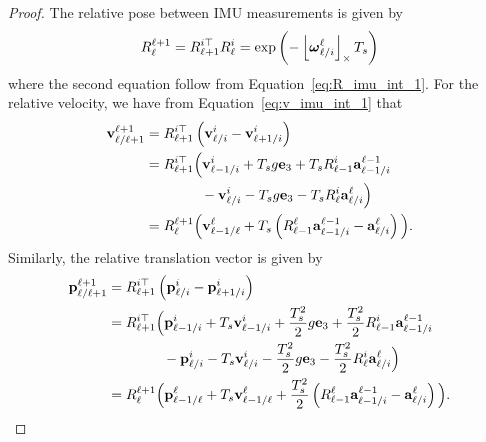 \begin{proof}
	The relative pose between IMU measurements is given by
	\[
	R_{\ell}^{\ell+1} = R_{\ell+1}^{i\top}R_{\ell}^i 
		= \exp\left(-\left\lfloor\boldsymbol{\omega}_{\ell/i}^{\ell}\right\rfloor_{\times} T_s \right)
	\]
	where the second equation follow from Equation~\eqref{eq:R_imu_int_1}.
	For the relative velocity, we have from Equation~\eqref{eq:v_imu_int_1} that
	\begin{align*}
	\mathbf{v}_{\ell/\ell+1}^{\ell+1} 
	&= R_{\ell+1}^{i\top}\left(\mathbf{v}_{\ell/i}^i - \mathbf{v}_{\ell+1/i}^i\right) \\
	&= 	R_{\ell+1}^{i\top}\Big(\mathbf{v}_{\ell-1/i}^i + T_s g\mathbf{e}_3 + T_s R_{\ell-1}^i 
		\mathbf{a}_{\ell-1/i}^{\ell-1} 
		\\ &\qquad\qquad
		- \mathbf{v}_{\ell/i}^i - T_s g\mathbf{e}_3 - T_s R_{\ell}^i \mathbf{a}_{\ell/i}^{\ell} \Big)  \\
	&= 	R_{\ell}^{\ell+1} \Big(\mathbf{v}_{\ell-1/\ell}^{\ell}
		+ T_s \left( R_{\ell-1}^{\ell} \mathbf{a}_{\ell-1/i}^{\ell-1}
		- \mathbf{a}_{\ell/i}^{\ell} \right) \Big).
	\end{align*}
	Similarly, the relative translation vector is given by
	\begin{align*}
	\mathbf{p}_{\ell/\ell+1}^{\ell+1} 
	&= R_{\ell+1}^{i\top}\left(\mathbf{p}_{\ell/i}^i - \mathbf{p}_{\ell+1/i}^i\right) \\
	&= R_{\ell+1}^{i\top}\Big(\mathbf{p}_{\ell-1/i}^{i} + T_s\mathbf{v}_{\ell-1/i}^i + \frac{T_s^2}{2} g\mathbf{e}_3 + \frac{T_s^2}{2} R_{\ell-1}^i \mathbf{a}_{\ell-1/i}^{\ell-1}
	\\ &\qquad\qquad
	-\mathbf{p}_{\ell/i}^{i} - T_s\mathbf{v}_{\ell/i}^i - \frac{T_s^2}{2} g\mathbf{e}_3 - \frac{T_s^2}{2} R_{\ell}^i \mathbf{a}_{\ell/i}^{\ell} \Big) \\
	&= R_{\ell}^{\ell+1}\Big(\mathbf{p}_{\ell-1/\ell}^{\ell} 
	+ T_s \mathbf{v}_{\ell-1/\ell}^{\ell} 
	+\frac{T_s^2}{2}\left(R_{\ell-1}^{\ell}\mathbf{a}_{\ell-1/i}^{\ell-1} - \mathbf{a}_{\ell/i}^{\ell}\right)\Big).
	\end{align*}
\end{proof}

